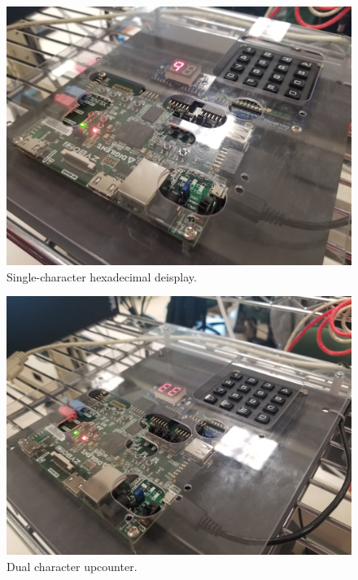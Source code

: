 \documentclass{article}
\begin{document}
    \begin{figure}[H]
        \includegraphics[width=125mm]{display_single.jpg}
        \caption{Single-character hexadecimal deisplay.}
        \label{fig:display_single}
    \end{figure}

    
    \begin{figure}[H]
        \includegraphics[width=125mm]{counter_dual.jpg}
        \caption{Dual character upcounter.}
        \label{fig:counter_dual}
    \end{figure}
\end{document}
